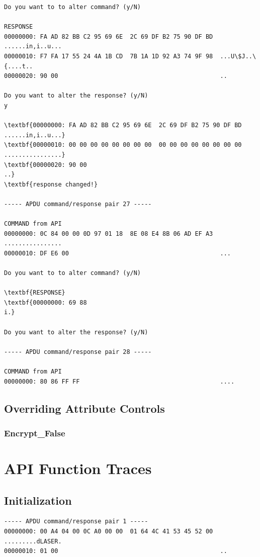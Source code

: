 \documentclass[bsc,frontabs,twoside,singlespacing,parskip,deptreport]{infthesis}     %
\begin{document}
\begin{appendices}
\begin{Verbatim}[commandchars=\\\{\}, fontsize=\small]
Do you want to to alter command? (y/N)

RESPONSE
00000000: FA AD 82 BB C2 95 69 6E  2C 69 DF B2 75 90 DF BD  ......in,i..u...
00000010: F7 FA 17 55 24 4A 1B CD  7B 1A 1D 92 A3 74 9F 98  ...U\$J..\{....t..
00000020: 90 00                                             ..

Do you want to alter the response? (y/N)
y

\textbf{00000000: FA AD 82 BB C2 95 69 6E  2C 69 DF B2 75 90 DF BD  ......in,i..u...}
\textbf{00000010: 00 00 00 00 00 00 00 00  00 00 00 00 00 00 00 00  ................}
\textbf{00000020: 90 00                                             ..}
\textbf{response changed!}

----- APDU command/response pair 27 -----

COMMAND from API
00000000: 0C 84 00 00 0D 97 01 18  8E 08 E4 8B 06 AD EF A3  ................
00000010: DF E6 00                                          ...

Do you want to to alter command? (y/N)

\textbf{RESPONSE}
\textbf{00000000: 69 88                                             i.}

Do you want to alter the response? (y/N)

----- APDU command/response pair 28 -----

COMMAND from API
00000000: 80 86 FF FF                                       ....
\end{Verbatim}

\section{Overriding Attribute Controls}
\subsection{Encrypt\_False}


\chapter{API Function Traces}

\section{Initialization}
\begin{Verbatim}[commandchars=\\\{\}, fontsize=\small]
----- APDU command/response pair 1 -----
00000000: 00 A4 04 00 0C A0 00 00  01 64 4C 41 53 45 52 00  .........dLASER.
00000010: 01 00                                             ..


\end{Verbatim}
\end{appendices}
\end{document}
